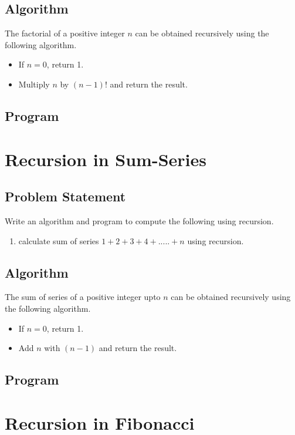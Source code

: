\documentclass[11pt]{report}
\begin{document}
\section{Algorithm}
The factorial of a positive integer $n$ can be obtained recursively using the following algorithm.
\begin{itemize}
\item If $n=0$, return 1.
\item Multiply $n$ by $(n-1)!$ and return the result. 
\end{itemize}

\section{Program}
        

\chapter{Recursion in Sum-Series}
\section{Problem Statement}
Write an algorithm and program to compute the following using recursion.
\begin{enumerate}
  \item calculate sum of series $1+2+3+4+.....+n$ using recursion.
\end{enumerate}
\section{Algorithm}
The sum of series of a positive integer upto $n$ can be obtained recursively using the following algorithm.
\begin{itemize}
\item If $n=0$, return 1.
\item Add $n$ with $(n-1)$ and return the result. 
\end{itemize}

\section{Program}
        

\chapter{Recursion in Fibonacci}
\end{document}
